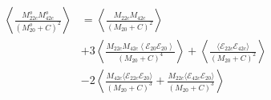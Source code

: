 \begin{equation}
\begin{split}
    \left\langle \frac{M^o_{22c}M^o_{42c}}{(M^o_{20}+C)^2}\right\rangle
    &= \left\langle \frac{M_{22c}M_{42c}}{(M_{20}+C)^2}\right\rangle\\
    &+3\left\langle\frac{M_{22c}M_{42c}
        \left\langle\mathcal{E}_{20}\mathcal{E}_{20}\right\rangle}
                    {(M_{20}+C)^4}
    \right\rangle
    + \left\langle
        \frac{\langle\mathcal{E}_{22c}\mathcal{E}_{42c}\rangle}{(M_{20}+C)^2}
        \right\rangle\\
    &- 2\left\langle\frac{M_{42c}\langle\mathcal{E}_{22c}\mathcal{E}_{20}\rangle}
        {(M_{20}+C)^3}
        + \frac{M_{22c}\langle\mathcal{E}_{42c}\mathcal{E}_{20}\rangle}
        {(M_{20}+C)^3}\right\rangle\\
\end{split}
\end{equation}
